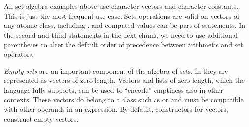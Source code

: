 \documentclass[krantz2]{krantz}\usepackage{knitr}%
\begin{document}
\begin{explainbox}
All set algebra examples above use character vectors and character constants. This is just the most frequent use case. Sets operations are valid on vectors of any atomic class, including , and computed values can be part of statements. In the second and third statements in the next chunk, we need to use additional parentheses to alter the default order of precedence between arithmetic and set operators.

\begin{knitrout}\footnotesize
{}\color{fgcolor}
\end{knitrout}

\emph{Empty sets} are an important component of the algebra of sets, in \Rlang they are represented as vectors of zero length. Vectors and lists of zero length, which the \Rlang language fully supports, can be used to ``encode'' emptiness also in other contexts. These vectors do belong to a class such as  or  and must be compatible with other operands in an expression. By default, constructors for vectors, construct empty vectors.


\end{explainbox}
\end{document}
